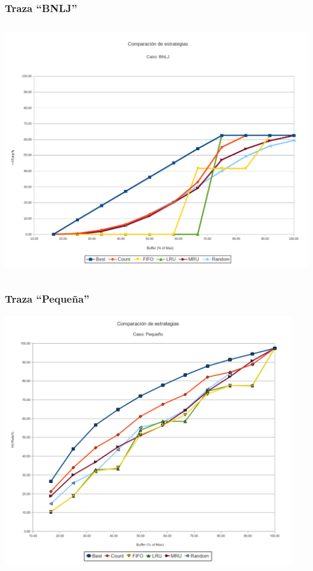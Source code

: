\subsubsection*{Traza ``BNLJ''} 
\begin{center}
  \includegraphics[height=11cm]{bnlj.png}
\end{center}  
\subsubsection*{Traza ``Peque\~na''} 
\begin{center}
  \includegraphics[height=11cm]{small.png}
\end{center}  
